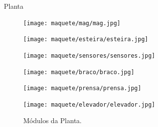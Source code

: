 \begin{frame}{Planta}
   \begin{figure}[ht]
       \begin{minipage}[b]{0.2\linewidth}
         \centering
  \texttt{[image: maquete/mag/mag.jpg]}
       \end{minipage}
       \begin{minipage}[b]{0.2\linewidth}
         \centering
  \texttt{[image: maquete/esteira/esteira.jpg]}
       \end{minipage}
       \begin{minipage}[b]{0.2\linewidth}
         \centering
  \texttt{[image: maquete/sensores/sensores.jpg]}
\end{minipage}

     
       \begin{minipage}[b]{0.2\linewidth}
         \centering
  \texttt{[image: maquete/braco/braco.jpg]}
       \end{minipage}
       \hspace{0.5cm}
       \begin{minipage}[b]{0.2\linewidth}
           \centering
  \texttt{[image: maquete/prensa/prensa.jpg]}
       \end{minipage}
       \begin{minipage}[b]{0.2\linewidth}
           \centering
         \texttt{[image: maquete/elevador/elevador.jpg]}
       \end{minipage}
  \caption{Módulos da Planta.}
   \end{figure}
\end{frame}


